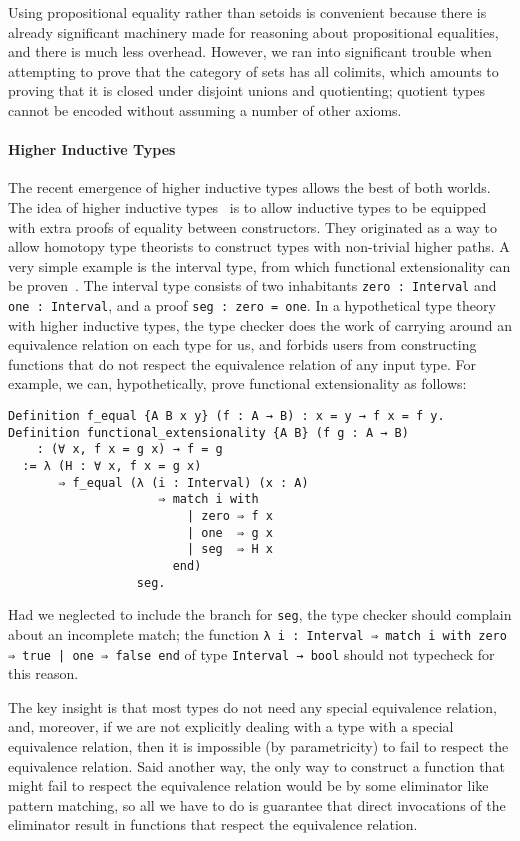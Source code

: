 Using propositional equality rather than setoids is convenient because there is already significant machinery made for reasoning about propositional equalities, and there is much less overhead.
However, we ran into significant trouble when attempting to prove that the category of sets has all colimits, which amounts to proving that it is closed under disjoint unions and quotienting; quotient types cannot be encoded without assuming a number of other axioms.

\paragraph{Higher Inductive Types}\label{sec:hit}
The recent emergence of higher inductive types allows the best of both worlds.
 The idea of higher inductive types~\cite{HoTTBook} is to allow inductive types to be equipped with extra proofs of equality between constructors.
They originated as a way to allow homotopy type theorists to construct types with non-trivial higher paths.
A very simple example is the interval type, from which functional extensionality can be proven~\cite{interval-implies-funext}.
The interval type consists of two inhabitants \texttt{zero : Interval} and \texttt{one : Interval}, and a proof \texttt{seg : zero = one}.
In a hypothetical type theory with higher inductive types, the type checker does the work of carrying around an equivalence relation on each type for us, and forbids users from constructing functions that do not respect the equivalence relation of any input type.
For example, we can, hypothetically, prove functional extensionality as follows:
\begin{verbatim}
Definition f_equal {A B x y} (f : A → B) : x = y → f x = f y.
Definition functional_extensionality {A B} (f g : A → B)
    : (∀ x, f x = g x) → f = g
  := λ (H : ∀ x, f x = g x)
       ⇒ f_equal (λ (i : Interval) (x : A)
                     ⇒ match i with
                         | zero ⇒ f x
                         | one  ⇒ g x
                         | seg  ⇒ H x
                       end)
                  seg.
\end{verbatim}
Had we neglected to include the branch for \texttt{seg}, the type checker should complain about an incomplete match; the function \texttt{λ i : Interval ⇒ match i with zero ⇒ true | one ⇒ false end} of type \texttt{Interval → bool} should not typecheck for this reason.

The key insight is that most types do not need any special equivalence relation, and, moreover, if we are not explicitly dealing with a type with a special equivalence relation, then it is impossible (by parametricity) to fail to respect the equivalence relation.
Said another way, the only way to construct a function that might fail to respect the equivalence relation would be by some eliminator like pattern matching, so all we have to do is guarantee that direct invocations of the eliminator result in functions that respect the equivalence relation.

